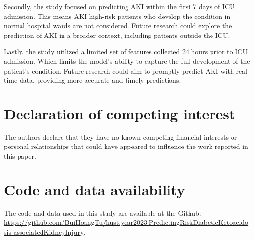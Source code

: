 \documentclass[sn-mathphys-num]{sn-jnl}%
\theoremstyle{thmstyleone}%
\theoremstyle{thmstyletwo}%
\theoremstyle{thmstylethree}%
\begin{document}
Secondly, the study focused on predicting AKI within the first 7 days of ICU admission.
This means AKI high-risk patients who develop the condition in normal hospital wards are not considered.
Future research could explore the prediction of AKI in a broader context, including patients outside the ICU.

Lastly, the study utilized a limited set of features collected 24 hours prior to ICU admission.
Which limits the model's ability to capture the full development of the patient's condition.
Future research could aim to promptly predict AKI with real-time data, providing more accurate and timely predictions.


\section*{Declaration of competing interest}
The authors declare that they have no known competing financial
interests or personal relationships that could have appeared to
influence the work reported in this paper.

\section*{Code and data availability}
The code and data used in this study are available at the Github:
\url{https://github.com/BuiHoangTu/hust.year2023.PredictingRiskDiabeticKetoacidosis-associatedKidneyInjury}.



\end{document}
